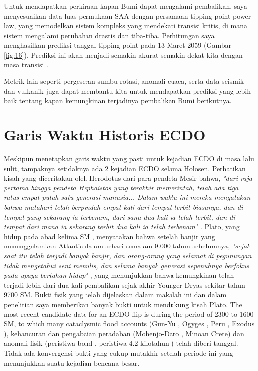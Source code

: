 \documentclass[10pt,twocolumn,letterpaper]{article}
\begin{document}
Untuk mendapatkan perkiraan kapan Bumi dapat mengalami pembalikan, saya menyesuaikan data luas permukaan SAA dengan persamaan tipping point power-law, yang memodelkan sistem kompleks yang mendekati transisi kritis, di mana sistem mengalami perubahan drastis dan tiba-tiba. Perhitungan saya menghasilkan prediksi tanggal tipping point pada 13 Maret 2059 (Gambar \ref{fig:16}). Prediksi ini akan menjadi semakin akurat semakin dekat kita dengan masa transisi \cite{136}.

Metrik lain seperti pergeseran sumbu rotasi, anomali cuaca, serta data seismik dan vulkanik juga dapat membantu kita untuk mendapatkan prediksi yang lebih baik tentang kapan kemungkinan terjadinya pembalikan Bumi berikutnya.

\section{Garis Waktu Historis ECDO}

Meskipun menetapkan garis waktu yang pasti untuk kejadian ECDO di masa lalu sulit, tampaknya setidaknya ada 2 kejadian ECDO selama Holosen. Perhatikan kisah yang diceritakan oleh Herodotus dari para pendeta Mesir bahwa, \textit{"dari raja pertama hingga pendeta Hephaistos yang terakhir memerintah, telah ada tiga ratus empat puluh satu generasi manusia... Dalam waktu ini mereka mengatakan bahwa matahari telah berpindah empat kali dari tempat terbit biasanya, dan di tempat yang sekarang ia terbenam, dari sana dua kali ia telah terbit, dan di tempat dari mana ia sekarang terbit dua kali ia telah terbenam"} \cite{32}. Plato, yang hidup pada abad kelima SM \cite{111}, menyatakan bahwa setelah banjir yang menenggelamkan Atlantis dalam sehari semalam 9.000 tahun sebelumnya, \textit{"sejak saat itu telah terjadi banyak banjir, dan orang-orang yang selamat di pegunungan tidak mengetahui seni menulis, dan selama banyak generasi sepenuhnya berfokus pada upaya bertahan hidup"} \cite{112}, yang menunjukkan bahwa kemungkinan telah terjadi lebih dari dua kali pembalikan sejak akhir Younger Dryas sekitar tahun 9700 SM. Bukti fisik yang telah dijelaskan dalam makalah ini dan dalam penelitian saya \cite{2} memberikan banyak bukti untuk mendukung kisah Plato.
The most recent candidate date for an ECDO flip is during the period of 2300 to 1600 SM, to which many cataclysmic flood accounts (Gun-Yu \cite{113,114,115}, Ogyges \cite{116,117}, Peru \cite{118,119}, Exodus \cite{120}), kehancuran dan pengabaian peradaban (Mohenjo-Daro \cite{121}, Minoan Crete\cite{100,101}) dan anomali fisik (peristiwa bond \cite{122}, peristiwa 4.2 kilotahun \cite{90}) telah diberi tanggal. Tidak ada konvergensi bukti yang cukup mutakhir setelah periode ini yang menunjukkan suatu kejadian bencana besar.
\end{document}
